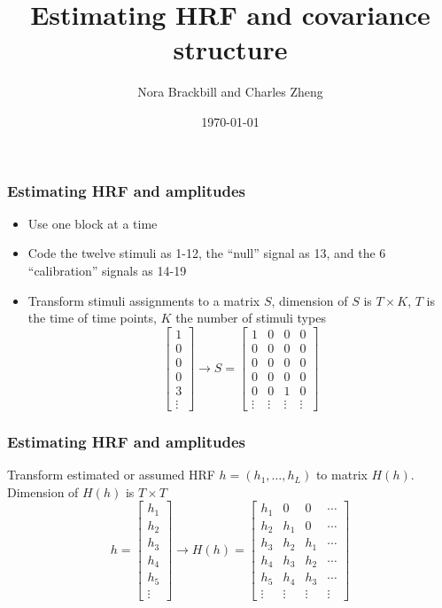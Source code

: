 \documentclass{beamer}
\title[Exercise 2]{Estimating HRF and covariance structure}
\author{Nora Brackbill and Charles Zheng} %
\institute[Stanford] %
{Stanford University}
\date{\today} %
\begin{document}
\begin{frame}
\titlepage %
\end{frame}


\begin{frame}
\frametitle{Estimating HRF and amplitudes}
\begin{itemize}
\item Use one block at a time
\item Code the twelve stimuli as 1-12, the ``null'' signal as 13, and the 6 ``calibration'' signals as 14-19
\item Transform stimuli assignments to a matrix $S$,
dimension of $S$ is $T \times K$, $T$ is the time of time points, $K$ the number of stimuli types
\[
\begin{bmatrix}
1\\0\\0\\0\\3\\\vdots
\end{bmatrix} \rightarrow
S = 
\begin{bmatrix}
1 & 0 & 0 & 0\\
0 & 0 & 0 & 0\\
0 & 0 & 0 & 0\\
0 & 0 & 0 & 0\\
0 & 0 & 1 & 0\\
\vdots & \vdots & \vdots & \vdots
\end{bmatrix}
\]
\end{itemize}
\end{frame}


\begin{frame}
\frametitle{Estimating HRF and amplitudes}
Transform estimated or assumed HRF $h = (h_1,\hdots,h_L)$ to matrix $H(h)$.
Dimension of $H(h)$ is $T \times T$
\[
h = 
\begin{bmatrix}
h_1\\h_2\\h_3\\h_4\\h_5\\\vdots
\end{bmatrix} \rightarrow
H(h) = 
\begin{bmatrix}
h_1 & 0 & 0 & \cdots\\
h_2 & h_1 & 0 & \cdots\\
h_3 & h_2 & h_1 & \cdots\\
h_4 & h_3 & h_2 & \cdots\\
h_5 & h_4 & h_3 & \cdots\\
\vdots & \vdots & \vdots & \vdots
\end{bmatrix}
\]

\end{frame}
\end{document}
